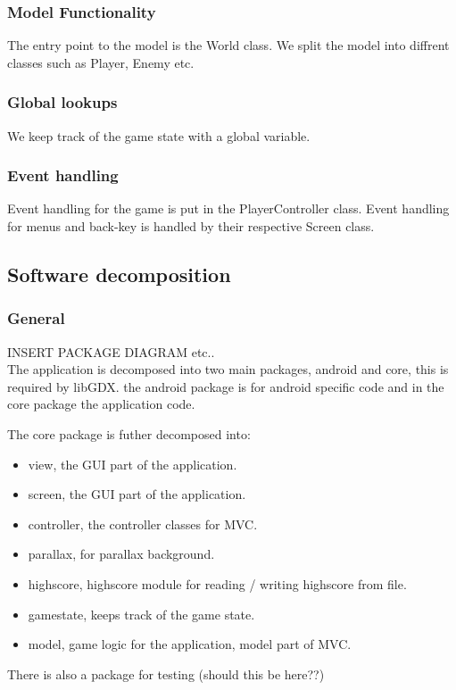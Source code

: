\documentclass{article}
\begin{document}
\subsubsection{Model Functionality}
The entry point to the model is the World class. We split the model into diffrent classes such as Player, Enemy etc.

\subsubsection{Global lookups}
We keep track of the game state with a global variable.

\subsubsection{Event handling}
Event handling for the game is put in the PlayerController class. Event handling for menus and back-key is handled by their respective Screen class.

\subsection{Software decomposition}
\subsubsection{General}
INSERT PACKAGE DIAGRAM etc.. \\
The application is decomposed into two main packages, android and core, this is required by libGDX. the android package is for android specific code and in the core package the application code.

The core package is futher decomposed into:
\begin{itemize}
  \item view, the GUI part of the application.
  \item screen, the GUI part of the application.
  \item controller, the controller classes for MVC.
  \item parallax, for parallax background.
  \item highscore, highscore module for reading / writing highscore from file.
  \item gamestate, keeps track of the game state.
  \item model, game logic for the application, model part of MVC.
\end{itemize}

There is also a package for testing (should this be here??)
\end{document}
